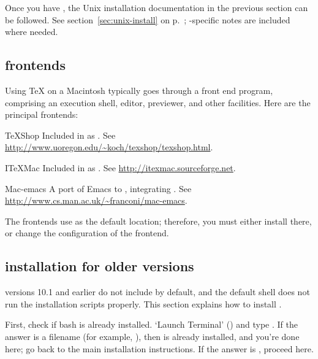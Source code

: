 \documentclass{article}
\begin{document}
Once you have , the Unix installation documentation in the
previous section can be followed.  See section~\ref{sec:unix-install} on
p.~\pageref{sec:unix-install}; \MacOSX-specific notes are included where
needed.


\subsection{\MacOSX{} frontends}

Using \TeX{} on a Macintosh typically goes through a front end program,
comprising an execution shell, editor, previewer, and other facilities.
Here are the principal frontends:

\begin{cmddescription}
\item [TeXShop] Included in \TeXLive{} as
.  See
\url{http://www.uoregon.edu/~koch/texshop/texshop.html}.

\item [ITeXMac] Included in \TeXLive{} as
.  See
\url{http://itexmac.sourceforge.net}.

\item [Mac-emacs] A port of Emacs to \MacOSX{}, integrating
.  See \url{http://www.cs.man.ac.uk/~franconi/mac-emacs}.

\end{cmddescription}

The frontends use  as the default location;
therefore, you must either install \TeXLive{} there, or change the
configuration of the frontend.


\subsection{ installation for older \MacOSX{} versions}
\label{sec:mac-bash}

\MacOSX{} versions 10.1 and earlier do not include  by
default, and the default shell does not run the \TeXLive{} installation
scripts properly.  This section explains how to install .

First, check if bash is already installed.  `Launch Terminal'
() and type .  If the answer is a filename (for example,
), then  is already installed, and you're done
here; go back to the main installation instructions.
If the answer is , proceed here.
\end{document}

